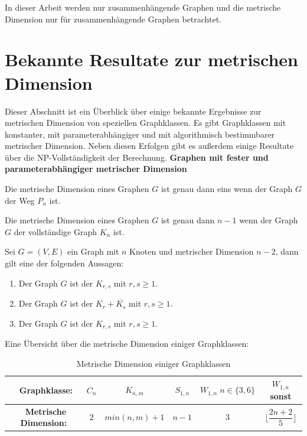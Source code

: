 \begin{bem}
In dieser Arbeit werden nur zusammenhängende Graphen und die metrische Dimension nur für zusammenhängende Graphen betrachtet.
\end{bem}
\newpage
\section{Bekannte Resultate zur metrischen Dimension}
\vspace{-2mm}
Dieser Abschnitt ist ein Überblick über einige bekannte Ergebnisse zur metrischen Dimension von speziellen Graphklassen. Es gibt Graphklassen mit konstanter, mit parameterabhängiger und mit algorithmisch bestimmbarer metrischer Dimension.\newline
Neben diesen Erfolgen gibt es außerdem einige Resultate über die NP-Vollständigkeit der Berechnung.\newline\newline
{\textbf{Graphen mit fester und parameterabhängiger metrischer Dimension}}
\begin{lem}
\label{path}\cite{landmarks}
Die metrische Dimension eines Graphen $G$ ist genau dann eins wenn der Graph $G$ der Weg $P_n$ ist.
\end{lem}
\begin{lem}
\label{complete}\cite{reso}
Die metrische Dimension eines Graphen $G$ ist genau dann $n-1$ wenn der Graph $G$ der vollständige Graph $K_n$ ist.
\end{lem}
\begin{lem}\cite{reso}
Sei $G = (V, E)$ ein Graph mit $n$ Knoten und metrischer Dimension $n-2$, dann gilt eine der folgenden Aussagen:
\begin{enumerate}
\item Der Graph $G$ ist der $K_{r,s}$ mit $r,s \geq 1$.
\item Der Graph $G$ ist der $K_{r}+ \overline{K_s}$ mit $r,s \geq 1$.
\item Der Graph $G$ ist der $K_{r,s}$ mit $r,s \geq 1$.
\end{enumerate}
\end{lem}
Eine Übersicht über die metrische Dimension einiger Graphklassen:
  \begin{table}[htb]
     \centering
     \begin{tabularx}{\textwidth}{|c|c|c|c|c|c|}
     	\hline  
       \parbox[c][4em][c]{0pt}{~}\textbf{Graphklasse:} & $C_n$&$K_{n,m}$&$S_{1,n}$&$W_{1,n}\;n \in \{3,6\}$&$W_{1,n}$ sonst \\[1em]
		\hline       
       \parbox[c][4em][c]{0pt}{~}\textbf{Metrische Dimension:}& $2$&$min(n,m)+1$& $n-1$  &$3$  &$\lfloor \dfrac{2n+2}{5} \rfloor$        \\[1em]
       	\hline  
     \end{tabularx}
 
     \caption{Metrische Dimension einiger Graphklassen}
     \label{tbl:Metrische Dimension einiger Graphklassen}
   \end{table}
